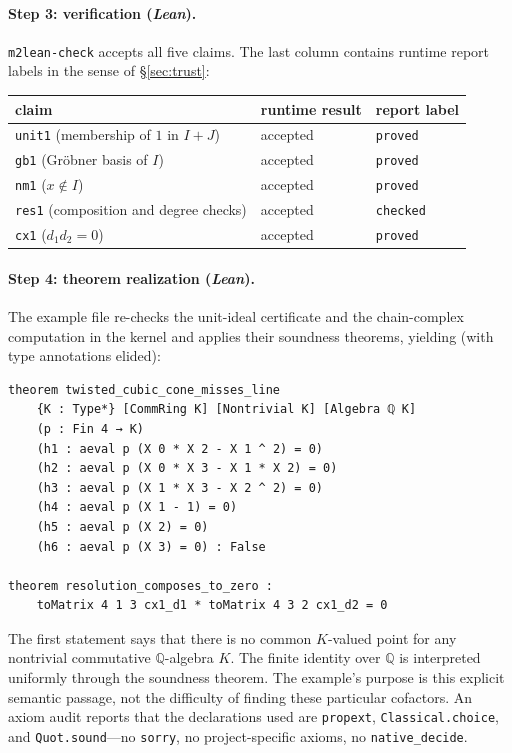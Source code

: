 \documentclass[11pt]{article}
\newcommand{\proved}{\textcolor{okgreen}{\code{proved}}}
\newcommand{\checked}{\textcolor{warnamber}{\code{checked}}}
\newcommand{\lean}{\textit{Lean}}
\newcommand{\QQ}{\mathbb{Q}}
\newcommand{\code}[1]{\texttt{#1}}
\begin{document}
\paragraph{Step 3: verification (\lean{}).}
\code{m2lean-check} accepts all five claims.  The last column contains
runtime report labels in the sense of \S\ref{sec:trust}:
\begin{center}
\small
\begin{tabular}{lll}
\toprule
claim & runtime result & report label \\
\midrule
\code{unit1} (membership of $1$ in $I{+}J$) & \textcolor{okgreen}{accepted} & \proved{} \\
\code{gb1} (Gr\"obner basis of $I$) & \textcolor{okgreen}{accepted} & \proved{} \\
\code{nm1} ($x \notin I$) & \textcolor{okgreen}{accepted} & \proved{} \\
\code{res1} (composition and degree checks) & \textcolor{okgreen}{accepted} & \checked{} \\
\code{cx1} ($d_1 d_2 = 0$) & \textcolor{okgreen}{accepted} & \proved{} \\
\bottomrule
\end{tabular}
\end{center}

\paragraph{Step 4: theorem realization (\lean{}).}
The example file re-checks the unit-ideal certificate and the
chain-complex computation in the kernel and applies their soundness theorems,
yielding (with type annotations elided):

\begin{lstlisting}[style=leanstyle]
theorem twisted_cubic_cone_misses_line
    {K : Type*} [CommRing K] [Nontrivial K] [Algebra ℚ K]
    (p : Fin 4 → K)
    (h1 : aeval p (X 0 * X 2 - X 1 ^ 2) = 0)
    (h2 : aeval p (X 0 * X 3 - X 1 * X 2) = 0)
    (h3 : aeval p (X 1 * X 3 - X 2 ^ 2) = 0)
    (h4 : aeval p (X 1 - 1) = 0)
    (h5 : aeval p (X 2) = 0)
    (h6 : aeval p (X 3) = 0) : False

theorem resolution_composes_to_zero :
    toMatrix 4 1 3 cx1_d1 * toMatrix 4 3 2 cx1_d2 = 0
\end{lstlisting}

The first statement says that there is no common $K$-valued point for
any nontrivial commutative $\QQ$-algebra $K$.  The finite identity over
$\QQ$ is interpreted uniformly through the soundness theorem.  The
example's purpose is this explicit semantic passage, not the difficulty
of finding these particular cofactors.  An axiom audit reports that
the declarations used are
\code{propext}, \code{Classical.choice}, and \code{Quot.sound}---no
\code{sorry}, no project-specific axioms, no \code{native\_decide}.
\end{document}
